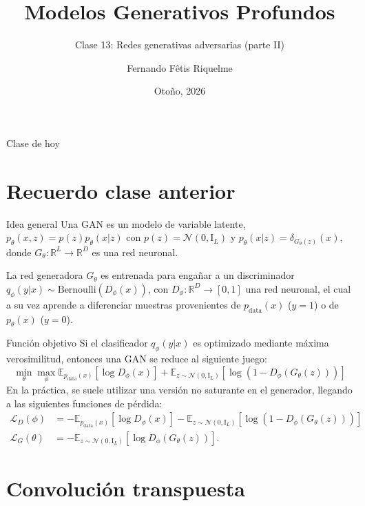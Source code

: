 \documentclass{beamer}
\title{Modelos Generativos Profundos}
\subtitle{Clase 13: Redes generativas adversarias (parte II)}
\author{Fernando Fêtis Riquelme}
\institute{
    Facultad de Ciencias Físicas y Matemáticas\\
    Universidad de Chile
}
\date{Otoño, 2026}
\newcommand{\R}{\mathbb{R}}
\begin{document}
\begin{frame}
    \titlepage
\end{frame}

\begin{frame}{Clase de hoy}
    \tableofcontents
\end{frame}

\section{Recuerdo clase anterior}

\begin{frame}{Idea general}
    Una GAN es un modelo de variable latente, $p_\theta(x,z)=p(z)p_\theta(x|z)$ con $p(z)=\mathcal{N}(0,\mathrm{I}_L)$ y $p_\theta(x|z)=\delta_{G_\theta(z)}(x)$, donde $G_\theta:\R^L\to\R^D$ es una red neuronal.

    La red generadora $G_\theta$ es entrenada para engañar a un discriminador $q_\phi(y| x)\sim\text{Bernoulli}(D_\phi(x))$, con $D_\phi:\R^D\to[0,1]$ una red neuronal, el cual a su vez aprende a diferenciar muestras provenientes de $p_\text{data}(x)$ ($y=1$) o de $p_\theta(x)$ ($y=0$).
\end{frame}

\begin{frame}{Función objetivo}
    Si el clasificador $q_\phi(y|x)$ es optimizado mediante máxima verosimilitud, entonces una GAN se reduce al siguiente juego:
    \begin{equation*}
        \min_\theta \max_\phi\mathbb{E}_{p_\text{data}(x)}\left[\log D_\phi(x)\right] + \mathbb{E}_{z\sim\mathcal{N}(0,\mathrm{I}_L)}\left[\log(1-D_\phi(G_\theta(z)))\right]
    \end{equation*}
    En la práctica, se suele utilizar una versión no saturante en el generador, llegando a las siguientes funciones de pérdida:
    \begin{align*}
        \mathcal{L}_D(\phi)   & = -\mathbb{E}_{p_\text{data}(x)}\left[\log D_\phi(x)\right] - \mathbb{E}_{z\sim\mathcal{N}(0,\mathrm{I}_L)}\left[\log(1-D_\phi(G_\theta(z)))\right] \\
        \mathcal{L}_G(\theta) & = -\mathbb{E}_{z\sim\mathcal{N}(0,\mathrm{I}_L)}\left[\log D_\phi(G_\theta(z))\right].
    \end{align*}
\end{frame}

\section{Convolución transpuesta}
\end{document}
